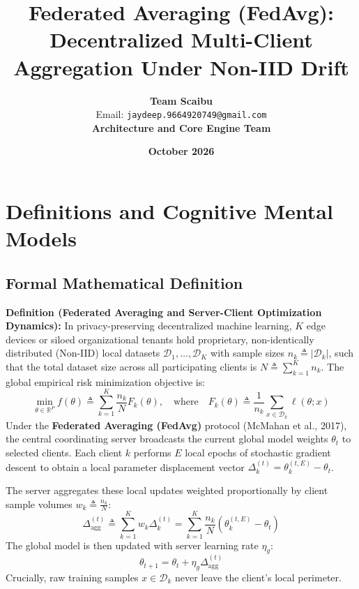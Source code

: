 \documentclass[11pt,a4paper]{article}
\title{\textbf{Federated Averaging (FedAvg): Decentralized Multi-Client Aggregation Under Non-IID Drift}}
\author{\textbf{Team Scaibu} \\ \small Email: \texttt{jaydeep.9664920749@gmail.com} \\ \small \textbf{Architecture and Core Engine Team}}
\date{\textbf{October 2026}}
\theoremstyle{definition}
\begin{document}
\maketitle

\section{Definitions and Cognitive Mental Models}

\subsection{Formal Mathematical Definition}
\textbf{Definition (Federated Averaging and Server-Client Optimization Dynamics):}
In privacy-preserving decentralized machine learning, $K$ edge devices or siloed organizational tenants hold proprietary, non-identically distributed (Non-IID) local datasets $\mathcal{D}_1, \dots, \mathcal{D}_K$ with sample sizes $n_k \triangleq |\mathcal{D}_k|$, such that the total dataset size across all participating clients is $N \triangleq \sum_{k=1}^K n_k$. The global empirical risk minimization objective is:
{\boldmath
\begin{equation}
\min_{\theta \in \mathbb{R}^P} f(\theta) \triangleq \sum_{k=1}^K \frac{n_k}{N} F_k(\theta), \quad \text{where} \quad F_k(\theta) \triangleq \frac{1}{n_k} \sum_{x \in \mathcal{D}_k} \ell(\theta; x)
\end{equation}
}
Under the \textbf{Federated Averaging (FedAvg)} protocol (McMahan et al., 2017), the central coordinating server broadcasts the current global model weights $\theta_t$ to selected clients. Each client $k$ performs $E$ local epochs of stochastic gradient descent to obtain a local parameter displacement vector $\Delta_k^{(t)} = \theta_k^{(t, E)} - \theta_t$.

The server aggregates these local updates weighted proportionally by client sample volumes $w_k \triangleq \frac{n_k}{N}$:
{\boldmath
\begin{equation}
\Delta_{\text{agg}}^{(t)} \triangleq \sum_{k=1}^K w_k \Delta_k^{(t)} = \sum_{k=1}^K \frac{n_k}{N} \left( \theta_k^{(t, E)} - \theta_t \right)
\end{equation}
}
The global model is then updated with server learning rate $\eta_g$:
{\boldmath
\begin{equation}
\theta_{t+1} = \theta_t + \eta_g \Delta_{\text{agg}}^{(t)}
\end{equation}
}
Crucially, raw training samples $x \in \mathcal{D}_k$ never leave the client's local perimeter.
\end{document}
